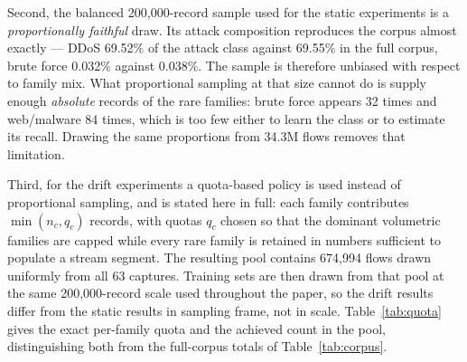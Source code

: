 \documentclass[11pt,a4paper]{article}
\begin{document}
Second, the balanced 200{,}000-record sample used for the static experiments is
a \emph{proportionally faithful} draw. Its attack composition reproduces the
corpus almost exactly --- DDoS 69.52\% of the attack class against 69.55\% in
the full corpus, brute force 0.032\% against 0.038\%. The sample is therefore
unbiased with respect to family mix. What proportional sampling at that size
cannot do is supply enough \emph{absolute} records of the rare families: brute
force appears 32 times and web/malware 84 times, which is too few either to
learn the class or to estimate its recall. Drawing the same proportions from
34.3M flows removes that limitation.

Third, for the drift experiments a quota-based policy is used instead of
proportional sampling, and is stated here in full: each family contributes
$\min(n_c, q_c)$ records, with quotas $q_c$ chosen so that the dominant
volumetric families are capped while every rare family is retained in numbers
sufficient to populate a stream segment. The resulting pool contains 674{,}994
flows drawn uniformly from all 63 captures. Training sets are then drawn from
that pool at the same 200{,}000-record scale used throughout the paper, so the
drift results differ from the static results in sampling frame, not in scale.
Table~\ref{tab:quota} gives the exact per-family quota and the achieved count
in the pool, distinguishing both from the full-corpus totals of
Table~\ref{tab:corpus}.
\end{document}
